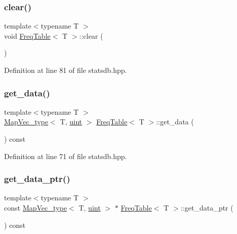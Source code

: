 \subsubsection{\texorpdfstring{clear()}{clear()}}
{\footnotesize\ttfamily template$<$typename T $>$ \\
void \hyperlink{class_freq_table}{Freq\+Table}$<$ T $>$\+::clear (\begin{DoxyParamCaption}{ }\end{DoxyParamCaption})\hspace{0.3cm}{\ttfamily [inline]}}



Definition at line 81 of file statsdb.\+hpp.

\mbox{\label{class_freq_table_a7b99496d1c2f4193654752856b30d1a5}} 
\subsubsection{\texorpdfstring{get\+\_\+data()}{get\_data()}}
{\footnotesize\ttfamily template$<$typename T $>$ \\
\hyperlink{typedefs_8hpp_a02ed8dec96bc528c8bc3d8cb3c4674a5}{Map\+Vec\+\_\+type}$<$ T, \hyperlink{typedefs_8hpp_a91ad9478d81a7aaf2593e8d9c3d06a14}{uint} $>$ \hyperlink{class_freq_table}{Freq\+Table}$<$ T $>$\+::get\+\_\+data (\begin{DoxyParamCaption}{ }\end{DoxyParamCaption}) const\hspace{0.3cm}{\ttfamily [inline]}}



Definition at line 71 of file statsdb.\+hpp.

\mbox{\label{class_freq_table_ab5dd6677f52072c93d18b2b9a3369ae7}} 
\subsubsection{\texorpdfstring{get\+\_\+data\+\_\+ptr()}{get\_data\_ptr()}}
{\footnotesize\ttfamily template$<$typename T $>$ \\
const \hyperlink{typedefs_8hpp_a02ed8dec96bc528c8bc3d8cb3c4674a5}{Map\+Vec\+\_\+type}$<$ T, \hyperlink{typedefs_8hpp_a91ad9478d81a7aaf2593e8d9c3d06a14}{uint} $>$ $\ast$ \hyperlink{class_freq_table}{Freq\+Table}$<$ T $>$\+::get\+\_\+data\+\_\+ptr (\begin{DoxyParamCaption}{ }\end{DoxyParamCaption}) const\hspace{0.3cm}{\ttfamily [inline]}}



